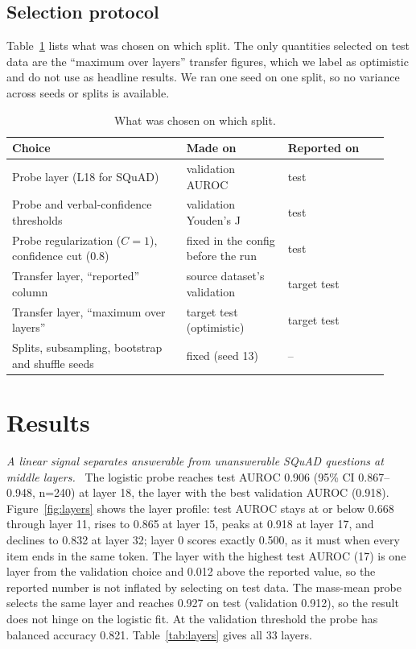 \documentclass[10pt]{article}
\renewcommand{\paragraph}[1]{\par\vspace{0.3em}\noindent\textit{#1}\ }
\begin{document}
\subsection{Selection protocol}
Table~\ref{tab:protocol} lists what was chosen on which split. The only quantities selected on test data are the ``maximum over layers'' transfer figures, which we label as optimistic and do not use as headline results. We ran one seed on one split, so no variance across seeds or splits is available.

\begin{table}[H]
\centering\small
\caption{What was chosen on which split.}
\label{tab:protocol}
\begin{tabular}{@{}p{0.43\linewidth}p{0.25\linewidth}p{0.25\linewidth}@{}}
\toprule
Choice & Made on & Reported on \\
\midrule
Probe layer (L18 for SQuAD) & validation AUROC & test \\
Probe and verbal-confidence thresholds & validation Youden's J & test \\
Probe regularization ($C=1$), confidence cut (0.8) & fixed in the config before the run & test \\
Transfer layer, ``reported'' column & source dataset's validation & target test \\
Transfer layer, ``maximum over layers'' & target test (optimistic) & target test \\
Splits, subsampling, bootstrap and shuffle seeds & fixed (seed 13) & -- \\
\bottomrule
\end{tabular}
\end{table}

\section{Results}
\paragraph{A linear signal separates answerable from unanswerable SQuAD questions at middle layers.}
The logistic probe reaches test AUROC 0.906 (95\% CI 0.867--0.948, n=240) at layer 18, the layer with the best validation AUROC (0.918). Figure~\ref{fig:layers} shows the layer profile: test AUROC stays at or below 0.668 through layer 11, rises to 0.865 at layer 15, peaks at 0.918 at layer 17, and declines to 0.832 at layer 32; layer 0 scores exactly 0.500, as it must when every item ends in the same token. The layer with the highest test AUROC (17) is one layer from the validation choice and 0.012 above the reported value, so the reported number is not inflated by selecting on test data. The mass-mean probe selects the same layer and reaches 0.927 on test (validation 0.912), so the result does not hinge on the logistic fit. At the validation threshold the probe has balanced accuracy 0.821. Table~\ref{tab:layers} gives all 33 layers.
\end{document}
